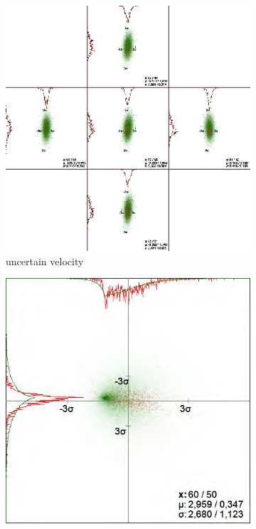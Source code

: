 \begin{figure}[t]
    \centering
    \begin{subfigure}{0.49\textwidth}
        \includegraphics[width=\textwidth]{Images/uncvelocity.png}
        \caption{uncertain velocity}
        \label{fig:uncvel}
    \end{subfigure}
    \begin{subfigure}{0.49\textwidth}
        \includegraphics[width=\textwidth]{Images/uncacceleration.png}

\end{subfigure}
\end{figure}
